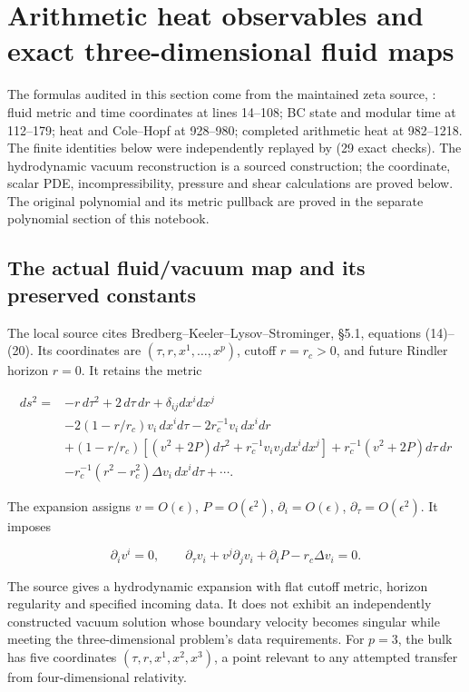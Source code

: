 \section{Arithmetic heat observables and exact three-dimensional fluid maps}\label{arithmetic-heat-observables-and-exact-three-dimensional-fluid-maps}

The formulas audited in this section come from the maintained zeta source,
: fluid metric and time
coordinates at lines 14--108; BC state and modular time at 112--179;
heat and Cole--Hopf at 928--980; completed arithmetic heat at 982--1218.
The finite identities below were independently replayed by
 (29 exact checks).
The hydrodynamic vacuum reconstruction is a sourced construction; the
coordinate, scalar PDE, incompressibility, pressure and shear calculations
are proved below. The original polynomial and its metric pullback are
proved in the separate polynomial section of this notebook.

\subsection{The actual fluid/vacuum map and its preserved constants}\label{the-actual-fluidvacuum-map-and-its-preserved-constants}

The local source cites Bredberg--Keeler--Lysov--Strominger, §5.1, equations (14)--(20). Its coordinates are \((\tau,r,x^1,\ldots,x^p)\), cutoff \(r=r_c>0\), and future Rindler horizon \(r=0\). It retains the metric

\[
\begin{aligned}
ds^2={}&-r\,d\tau^2+2\,d\tau\,dr+\delta_{ij}dx^idx^j\\
&-2(1-r/r_c)v_i\,dx^id\tau-2r_c^{-1}v_i\,dx^idr\\
&+(1-r/r_c)[(v^2+2P)d\tau^2+r_c^{-1}v_iv_jdx^idx^j]
+r_c^{-1}(v^2+2P)d\tau\,dr\\
&-r_c^{-1}(r^2-r_c^2)\Delta v_i\,dx^id\tau+\cdots.
\end{aligned}
\]

The expansion assigns \(v=O(\epsilon)\), \(P=O(\epsilon^2)\), \(\partial_i=O(\epsilon)\), \(\partial_{\tau}=O(\epsilon^2)\). It imposes

\[
\partial_i v^i=0,\qquad
\partial_\tau v_i+v^j\partial_jv_i+\partial_iP-r_c\Delta v_i=0.
\]

The source gives a hydrodynamic expansion with flat cutoff metric, horizon regularity and specified incoming data. It does not exhibit an independently constructed vacuum solution whose boundary velocity becomes singular while meeting the three-dimensional problem's data requirements. For \(p=3\), the bulk has five coordinates \((\tau,r,x^1,x^2,x^3)\), a point relevant to any attempted transfer from four-dimensional relativity.

